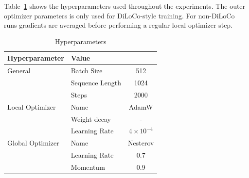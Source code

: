 \documentclass{article}
\begin{document}
Table~\ref{tab:hyperparameters} shows the hyperparameters used throughout the
experiments. The outer optimizer parameters is only used for DiLoCo-style
training. For non-DiLoCo runs gradients are averaged before performing a regular
local optimizer step.

\begin{table}[ht]
\centering
\begin{tabular}{llc}
\toprule
\textbf{Hyperparameter} & \textbf{Value} \\ 
\midrule
\multirow{1}{*}{General} & Batch Size & 512 \\ 
& Sequence Length & 1024 \\ 
& Steps & 2000 \\
\hline
\multirow{1}{*}{Local Optimizer} & Name & AdamW \\ 
& Weight decay & - \\ 
& Learning Rate & $4 \times 10^{-4}$ \\ 
\hline
\multirow{1}{*}{Global Optimizer} & Name & Nesterov \\ 
& Learning Rate & 0.7 \\ 
& Momentum & 0.9 \\ 
\bottomrule
\end{tabular}
\caption{Hyperparameters}
\label{tab:hyperparameters}
\end{table}
\end{document}
